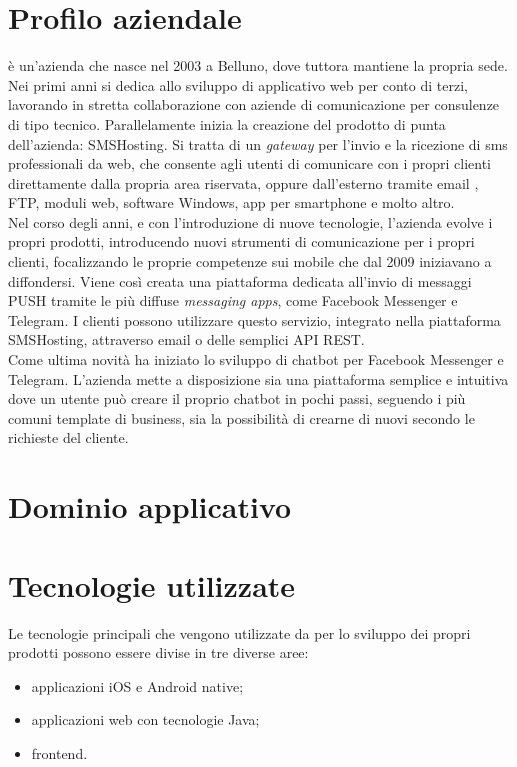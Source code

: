 \section{Profilo aziendale}
\azienda{} è un'azienda che nasce nel 2003 a Belluno, dove tuttora mantiene la propria sede. Nei primi anni si dedica allo sviluppo di applicativo web per conto di terzi, lavorando in stretta collaborazione con aziende di comunicazione per consulenze di tipo tecnico. Parallelamente inizia la creazione del prodotto di punta dell'azienda: SMSHosting. Si tratta di un \emph{gateway} per l'invio e la ricezione di sms professionali da web, che consente agli utenti di comunicare con i propri clienti direttamente dalla propria area riservata, oppure dall'esterno tramite email , FTP, moduli web, software Windows, app per smartphone e molto altro.  \\
Nel corso degli anni, e con l'introduzione di nuove tecnologie, l'azienda evolve i propri prodotti, introducendo nuovi strumenti di comunicazione per i propri clienti, focalizzando le proprie competenze sui mobile che dal 2009 iniziavano a diffondersi.
Viene così creata una piattaforma dedicata all'invio di messaggi PUSH tramite le più diffuse \emph{messaging apps}, come Facebook Messenger e Telegram. I clienti possono utilizzare questo servizio, integrato nella piattaforma SMSHosting, attraverso email o delle semplici API REST.\\
Come ultima novità \azienda{} ha iniziato lo sviluppo di \gls{chatbot} per Facebook Messenger e Telegram. L'azienda mette a disposizione sia una piattaforma semplice e intuitiva dove un utente può creare il proprio \gls{chatbot} in pochi passi, seguendo i più comuni template di business, sia la possibilità di crearne di nuovi secondo le richieste del cliente.

\section{Dominio applicativo}

\section{Tecnologie utilizzate}
Le tecnologie principali che vengono utilizzate da \azienda{} per lo sviluppo dei propri prodotti possono essere divise in tre diverse aree:
\begin{itemize}
	\item applicazioni iOS e Android native;
	\item applicazioni web con tecnologie Java;
	\item frontend.
\end{itemize} 

